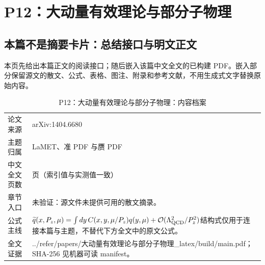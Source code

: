 \documentclass[UTF8,11pt,oneside]{ctexbook}
\begin{document}
\chapter{P12：大动量有效理论与部分子物理}
\section*{本篇不是摘要卡片：总结接口与明文正文}
本页先给出本篇正文的阅读接口；随后嵌入该篇中文全文的已构建 PDF。嵌入部分保留源文的散文、公式、表格、图注、附录和参考文献，不用生成式文字替换原始内容。
\begin{table}[htbp]
  \centering
  \caption{P12：大动量有效理论与部分子物理：内容档案}
  \small
  \begin{tabularx}{0.96\textwidth}{@{}p{3.3cm}>{\raggedright\arraybackslash}X@{}}
    \toprule
    论文来源 & arXiv:1404.6680 \\
    主题归属 & LaMET、准 PDF 与赝 PDF \\
    中文全文页数 & 7 页（索引值与实测值一致） \\
    章节入口 & 未验证：源文件未提供可用的散文摘录。 \\
    公式主线 & $\widetilde q(x,P_z,\mu)=\int dy\,C(x,y,\mu/P_z)q(y,\mu)+\mathcal O(\Lambda_{\rm QCD}^{2}/P_z^{2})$\newline\scriptsize 结构式仅用于连接本篇与主题，不替代下方全文中的原文公式。 \\
    全文证据 & ../\allowbreak{}refer/\allowbreak{}papers/\allowbreak{}大动量有效理论与部分子物理\_\allowbreak{}latex/\allowbreak{}build/\allowbreak{}main.pdf；SHA-256 见机器可读 manifest。 \\
    \bottomrule
  \end{tabularx}
\end{table}
\end{document}
